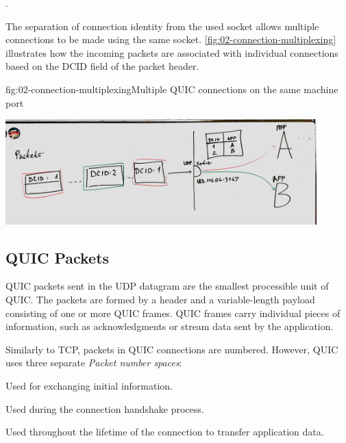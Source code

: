 
.

The separation of connection identity from the used socket allows multiple connections to be made
using the same socket. \autoref{fig:02-connection-multiplexing} illustrates how the incoming packets
are associated with individual connections based on the DCID field of the packet header.

\begin{myFigure}{fig:02-connection-multiplexing}{Multiple QUIC connections on the same machine port}

\includegraphics[width=0.9\textwidth]{img/02-socket-multiplexing}

\end{myFigure}


\subsection{QUIC Packets}

QUIC packets sent in the UDP datagram are the smallest processible unit of QUIC\@. The packets are
formed by a header and a variable-length payload consisting of one or more QUIC frames. QUIC frames
carry individual pieces of information, such as acknowledgments or stream data sent by the
application.

Similarly to TCP, packets in QUIC connections are numbered. However, QUIC uses three separate
\textit{Packet number spaces}:

\begin{enumerate}

   Used for exchanging initial information.

   Used during the connection handshake process.

   Used throughout the lifetime of the connection to transfer application data.

\end{enumerate}

